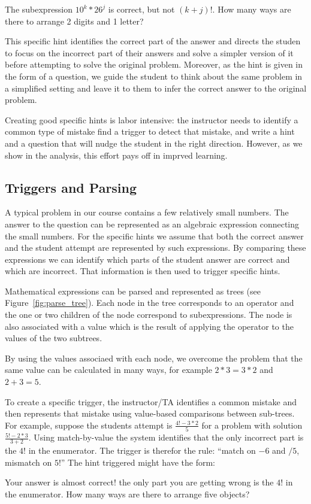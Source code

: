 \documentclass{sigchi}
\begin{document}
\begin{displayquote}
The subexpression $10^k*26^j$ is correct, but not $(k+j)!$. How many
ways are there to arrange 2 digits and 1 letter? 
\end{displayquote}

This specific hint identifies the correct part of the answer and
directs the studen to focus on the incorrect part of their answers and
solve a simpler version of it before attempting to solve the original
problem. Moreover, as the hint is given in the form of a question, we
guide the student to think about the same problem in a simplified
setting and leave it to them to infer the correct answer to the
original problem. 

Creating good specific hints is labor intensive: the instructor needs
to identify a common type of mistake find a trigger to detect that
mistake, and write a hint and a question that will nudge the student
in the right direction. However, as we show in the analysis, this
effort pays off in imprved learning.

\subsection*{Triggers and Parsing}

A typical problem in our course contains a few relatively small numbers. The
answer to the question can be represented as an algebraic expression
connecting the small numbers. For the specific hints we assume that
both the correct answer and the student attempt are represented by
such expressions. By comparing these expressions we can identify which
parts of the student answer are correct and which are incorrect. That
information is then used to trigger specific hints.

Mathematical expressions can be parsed and represented as trees (see
Figure~\ref{fig:parse_tree}). Each node in the tree corresponds to an
operator and the one or two children of the node correspond to
subexpressions. The node is also associated with a value which is the
result of applying the operator to the values of the two subtrees.

By using the values associaed with each node, we overcome the problem
that the same value can be calculated in many ways, for example $2*3 =
3*2$ and $2+3=5$. 

To create a specific trigger, the instructor/TA identifies a common
mistake and then represents that mistake using value-based comparisons
between sub-trees. For example,
suppose the students attempt is $\frac{4!-3*2}{5}$
for a problem with solution $\frac{5!-2*3}{3+2}$. Using match-by-value
the system identifies that the only incorrect part is the $4!$ in the enumerator.
The trigger is therefor the rule: ``match on $-6$ and $/5$, mismatch on $5!$''
The hint triggered might have the form:
\begin{displayquote}
Your answer is almost correct! the only part you are getting wrong is
the $4!$ in the enumerator. How many ways are there to arrange five objects?
\end{displayquote}
\end{document}
